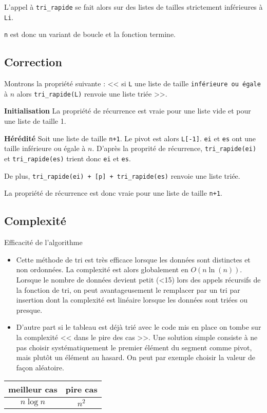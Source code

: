 L'appel à \texttt{tri\_rapide} se fait alors sur des listes de tailles strictement inférieures à \texttt{Li}.

\texttt{n} est donc un variant de boucle et la fonction termine. 


\subsection{Correction}
Montrons la propriété suivante : << si \texttt{L} une liste de taille \texttt{inférieure ou égale} à $n$ alors  \texttt{tri\_rapide(L)} renvoie une liste triée >>.

\textbf{Initialisation}
La propriété de récurrence est vraie pour une liste vide et pour une liste de taille 1.

\textbf{Hérédité}
Soit une liste de taille \texttt{n+1}. Le pivot est alors \texttt{L[-1]}. \texttt{ei} et \texttt{es} ont une taille inférieure ou égale à $n$. 
D'après la proprité de récurrence, \texttt{tri\_rapide(ei)} et \texttt{tri\_rapide(es)} trient donc \texttt{ei} et \texttt{es}.

De plus, \texttt{tri\_rapide(ei) + [p] + tri\_rapide(es)} renvoie une liste triée. 

La propriété de récurrence est donc vraie pour une liste de taille \texttt{n+1}.

\subsection{Complexité}
\begin{prop}{Efficacité de l'algorithme}
\begin{itemize}
\item Cette méthode de tri est très efficace lorsque les données sont distinctes et non ordonnées. La complexité est alors globalement en $O(n \ln(n))$. Lorsque le nombre de données devient petit (<15) lors des appels récursifs de la fonction de tri, on peut avantageusement le remplacer par un tri par insertion dont la complexité est linéaire lorsque les données sont triées ou presque. \cite{Beynet}




\item D'autre part si le tableau est déjà trié avec le code mis en place on tombe sur la complexité << dans le pire des cas >>. Une solution simple consiste à ne pas choisir systématiquement
le premier élément du segment comme pivot, mais plutôt un élément au hasard. On peut par exemple choisir la valeur de façon aléatoire. \cite{wack}
\end{itemize}

\begin{center}
\begin{tabular}{|c|c|}
\hline 
 meilleur cas &  pire cas \\ 
\hline 
$n \log n$ & $n^2$ \\ 
\hline 
\end{tabular} 
\end{center}

\end{prop}



